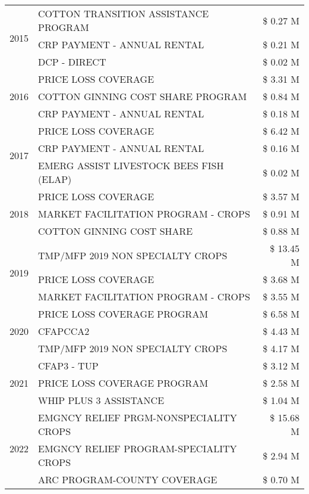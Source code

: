 \begin{tabular}{llr}
\cline{1-3}
\multirow[t]{3}{*}{2015} & COTTON TRANSITION ASSISTANCE PROGRAM & \$ 0.27 M \\
 & CRP PAYMENT - ANNUAL RENTAL & \$ 0.21 M \\
 & DCP - DIRECT & \$ 0.02 M \\
\cline{1-3}
\multirow[t]{3}{*}{2016} & PRICE LOSS COVERAGE & \$ 3.31 M \\
 & COTTON GINNING COST SHARE PROGRAM & \$ 0.84 M \\
 & CRP PAYMENT - ANNUAL RENTAL & \$ 0.18 M \\
\cline{1-3}
\multirow[t]{3}{*}{2017} & PRICE LOSS COVERAGE & \$ 6.42 M \\
 & CRP PAYMENT - ANNUAL RENTAL & \$ 0.16 M \\
 & EMERG ASSIST LIVESTOCK BEES FISH (ELAP) & \$ 0.02 M \\
\cline{1-3}
\multirow[t]{3}{*}{2018} & PRICE LOSS COVERAGE & \$ 3.57 M \\
 & MARKET FACILITATION PROGRAM - CROPS & \$ 0.91 M \\
 & COTTON GINNING COST SHARE & \$ 0.88 M \\
\cline{1-3}
\multirow[t]{3}{*}{2019} & TMP/MFP 2019 NON SPECIALTY CROPS & \$ 13.45 M \\
 & PRICE LOSS COVERAGE & \$ 3.68 M \\
 & MARKET FACILITATION PROGRAM - CROPS & \$ 3.55 M \\
\cline{1-3}
\multirow[t]{3}{*}{2020} & PRICE LOSS COVERAGE PROGRAM & \$ 6.58 M \\
 & CFAPCCA2 & \$ 4.43 M \\
 & TMP/MFP 2019 NON SPECIALTY CROPS & \$ 4.17 M \\
\cline{1-3}
\multirow[t]{3}{*}{2021} & CFAP3 - TUP & \$ 3.12 M \\
 & PRICE LOSS COVERAGE PROGRAM & \$ 2.58 M \\
 & WHIP PLUS 3 ASSISTANCE & \$ 1.04 M \\
\cline{1-3}
\multirow[t]{3}{*}{2022} & EMGNCY RELIEF PRGM-NONSPECIALITY CROPS & \$ 15.68 M \\
 & EMGNCY RELIEF PROGRAM-SPECIALITY CROPS & \$ 2.94 M \\
 & ARC PROGRAM-COUNTY COVERAGE & \$ 0.70 M \\
\cline{1-3}
\bottomrule
\end{tabular}
